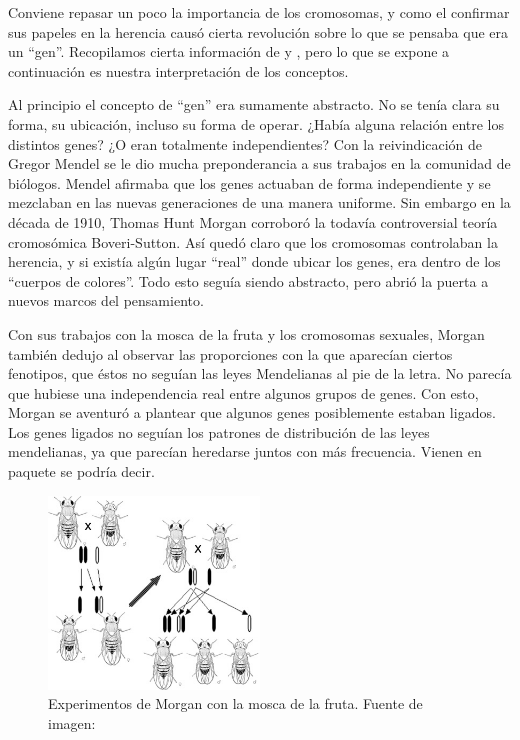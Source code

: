 \documentclass{article}
\begin{document}
	Conviene repasar un poco la importancia de los cromosomas, y como el confirmar sus papeles en la herencia causó cierta revolución sobre lo que se pensaba que era un ``gen''. Recopilamos cierta información de \cite{terwilliger1994handbook} y \cite{carrinnes2003handbook}, pero lo que se expone a continuación es nuestra interpretación de los conceptos.
	
	Al principio el concepto de ``gen'' era sumamente abstracto. No se tenía clara su forma, su ubicación, incluso su forma de operar. ¿Había alguna relación entre los distintos genes? ¿O eran totalmente independientes? Con la reivindicación de Gregor Mendel se le dio mucha preponderancia a sus trabajos en la comunidad de biólogos. Mendel afirmaba que los genes actuaban de forma independiente y se mezclaban en las nuevas generaciones de una manera uniforme. Sin embargo en la década de 1910, Thomas Hunt Morgan corroboró la todavía controversial teoría cromosómica Boveri-Sutton. Así quedó claro que los cromosomas controlaban la herencia, y si existía algún lugar ``real'' donde ubicar los genes, era dentro de los ``cuerpos de colores''. Todo esto seguía siendo abstracto, pero abrió la puerta a nuevos marcos del pensamiento.
	
	Con sus trabajos con la mosca de la fruta y los cromosomas sexuales, Morgan también dedujo al observar las proporciones con la que aparecían ciertos fenotipos, que éstos no seguían las leyes Mendelianas al pie de la letra. No parecía que hubiese una independencia real entre algunos grupos de genes. Con esto, Morgan se aventuró a plantear que algunos genes posiblemente estaban ligados. Los genes ligados no seguían los patrones de distribución de las leyes mendelianas, ya que parecían heredarse juntos con más frecuencia. Vienen en paquete se podría decir.
	
	\begin{figure}[h]
		\centering
		\includegraphics[width=0.5\textwidth]{images/1.jpg}
		\caption{Experimentos de Morgan con la mosca de la fruta. Fuente de imagen: \cite{morgan1919physical}}
		\label{1}
	\end{figure}
	
\end{document}
